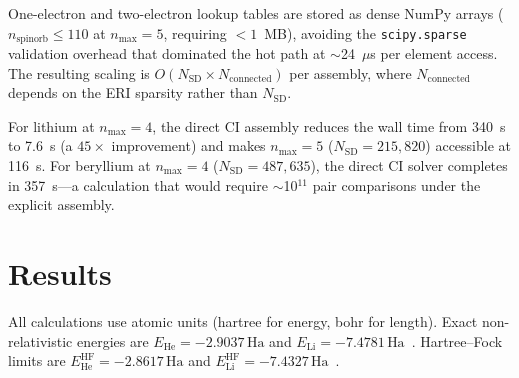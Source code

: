 \documentclass[aps,pra,twocolumn,superscriptaddress,longbibliography,floatfix]{revtex4-2}
\begin{document}
One-electron and two-electron lookup tables are stored as dense NumPy
arrays ($n_{\text{spinorb}} \leq 110$ at $n_{\max} = 5$, requiring
$<1$~MB), avoiding the \texttt{scipy.sparse} validation overhead that
dominated the hot path at $\sim$24~$\mu$s per element access.
The resulting scaling is
$O(N_{\text{SD}} \times N_{\text{connected}})$ per assembly,
where $N_{\text{connected}}$ depends on the ERI sparsity rather than
$N_{\text{SD}}$.

For lithium at $n_{\max}=4$, the direct CI assembly reduces the
wall time from 340~s to 7.6~s (a $45\times$ improvement) and makes
$n_{\max}=5$ ($N_{\text{SD}} = 215{,}820$) accessible at 116~s.
For beryllium at $n_{\max}=4$ ($N_{\text{SD}} = 487{,}635$), the
direct CI solver completes in 357~s---a calculation that would require
$\sim$10$^{11}$ pair comparisons under the explicit assembly.

\section{Results}
\label{sec:results}

All calculations use atomic units (hartree for energy, bohr for
length).
Exact non-relativistic energies are $E_{\text{He}} = -2.9037\,\text{Ha}$
and $E_{\text{Li}} = -7.4781\,\text{Ha}$~\cite{NIST_ASD}.
Hartree--Fock limits are $E_{\text{He}}^{\text{HF}} = -2.8617\,\text{Ha}$
and $E_{\text{Li}}^{\text{HF}} = -7.4327\,\text{Ha}$~\cite{Fischer1977}.
\end{document}
